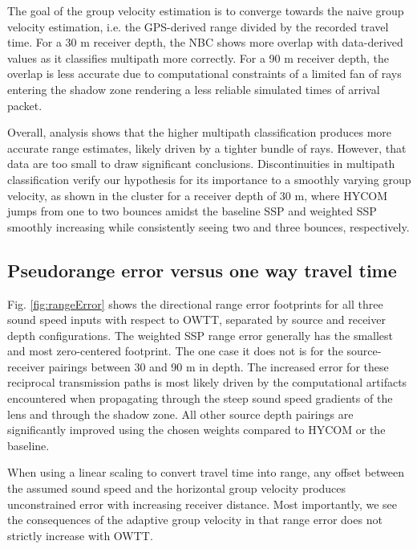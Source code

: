 The goal of the group velocity estimation is to converge towards the naive group velocity estimation, i.e. the GPS-derived range divided by the recorded travel time.
For a 30 m receiver depth, the NBC shows more overlap with data-derived values as it classifies multipath more correctly.
For a 90 m receiver depth, the overlap is less accurate due to computational constraints of a limited fan of rays entering the shadow zone rendering a less reliable simulated times of arrival packet.

Overall, analysis shows that the higher multipath classification produces more accurate range estimates, likely driven by a tighter bundle of rays.
However, that data are too small to draw significant conclusions.
 Discontinuities in multipath classification verify our hypothesis for its importance to a smoothly varying group velocity, as shown in the cluster for a receiver depth of 30 m, where HYCOM jumps from one to two bounces amidst the baseline SSP and weighted SSP smoothly increasing while consistently seeing two and three bounces, respectively.

\FloatBarrier
\subsection{Pseudorange error versus one way travel time}

Fig. \ref{fig:rangeError} shows the directional range error footprints for all three sound speed inputs with respect to OWTT, separated by source and receiver depth configurations.
The weighted SSP range error generally has the smallest and most zero-centered footprint.
The one case it does not is for the source-receiver pairings between 30 and 90 m in depth.
The increased error for these reciprocal transmission paths is most likely driven by the computational artifacts encountered when propagating through the steep sound speed gradients of the lens and through the shadow zone.
All other source depth pairings are significantly improved using the chosen weights compared to HYCOM or the baseline.

When using a linear scaling to convert travel time into range, any offset between the assumed sound speed and the horizontal group velocity produces unconstrained error with increasing receiver distance.
Most importantly, we see the consequences of the adaptive group velocity in that range error does not strictly increase with OWTT.

